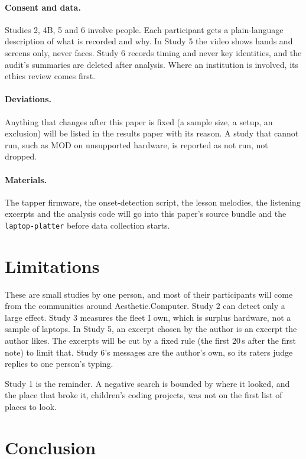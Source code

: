 \documentclass[10pt,letterpaper,twocolumn]{article}
\newcommand{\acdot}{{\color{acpink}.}}
\newcommand{\ac}{Aesthetic{\acdot}Computer}
\begin{document}
\paragraph{Consent and data.} Studies 2, 4B, 5 and 6 involve people. Each participant gets a plain-language description of what is recorded and why. In Study 5 the video shows hands and screens only, never faces. Study 6 records timing and never key identities, and the audit's summaries are deleted after analysis. Where an institution is involved, its ethics review comes first.

\paragraph{Deviations.} Anything that changes after this paper is fixed (a sample size, a setup, an exclusion) will be listed in the results paper with its reason. A study that cannot run, such as MOD on unsupported hardware, is reported as not run, not dropped.

\paragraph{Materials.} The tapper firmware, the onset-detection script, the lesson melodies, the listening excerpts and the analysis code will go into this paper's source bundle and the \texttt{laptop-platter} before data collection starts.

\section{Limitations}

These are small studies by one person, and most of their participants will come from the communities around \ac{}. Study 2 can detect only a large effect. Study 3 measures the fleet I own, which is surplus hardware, not a sample of laptops. In Study 5, an excerpt chosen by the author is an excerpt the author likes. The excerpts will be cut by a fixed rule (the first 20\,s after the first note) to limit that. Study 6's messages are the author's own, so its raters judge replies to one person's typing.

Study 1 is the reminder. A negative search is bounded by where it looked, and the place that broke it, children's coding projects, was not on the first list of places to look.

\section{Conclusion}
\end{document}
